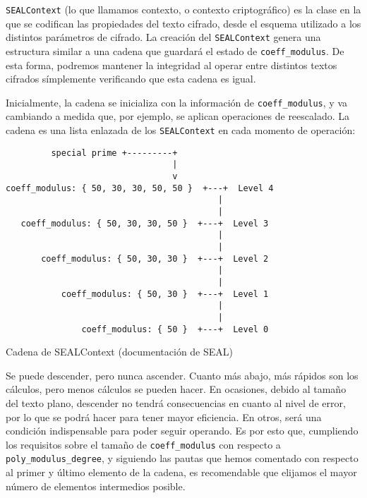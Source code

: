 \verb|SEALContext| (lo que llamamos contexto, o contexto criptográfico) es la clase en la que se codifican las propiedades del texto cifrado, desde el esquema utilizado a los distintos parámetros de cifrado. La creación del \verb|SEALContext| genera una estructura similar a una cadena que guardará el estado de \verb|coeff_modulus|. De esta forma, podremos mantener la integridad al operar entre distintos textos cifrados símplemente verificando que esta cadena es igual.

Inicialmente, la cadena se inicializa con la información de \verb|coeff_modulus|, y va cambiando a medida que, por ejemplo, se aplican operaciones de reescalado. La cadena es una lista enlazada de los \verb|SEALContext| en cada momento de operación:

\begin{listing}[ht]
    \begin{verbatim}
         special prime +---------+
                                 |
                                 v
coeff_modulus: { 50, 30, 30, 50, 50 }  +---+  Level 4
                                          |
                                          |
   coeff_modulus: { 50, 30, 30, 50 }  +---+  Level 3
                                          |
                                          |
       coeff_modulus: { 50, 30, 30 }  +---+  Level 2
                                          |
                                          |
           coeff_modulus: { 50, 30 }  +---+  Level 1
                                          |
                                          |
               coeff_modulus: { 50 }  +---+  Level 0
    \end{verbatim}
    \caption{Cadena de SEALContext (documentación de SEAL)}
    \label{fig:seal_levels}
\end{listing}

Se puede descender, pero nunca ascender. Cuanto más abajo, más rápidos son los cálculos, pero menos cálculos se pueden hacer. En ocasiones, debido al tamaño del texto plano, descender no tendrá consecuencias en cuanto al nivel de error, por lo que se podrá hacer para tener mayor eficiencia. En otros, será una condición indispensable para poder seguir operando. Es por esto que, cumpliendo los requisitos sobre el tamaño de \verb|coeff_modulus| con respecto a \verb|poly_modulus_degree|, y siguiendo las pautas que hemos comentado con respecto al primer y último elemento de la cadena, es recomendable que elijamos el mayor número de elementos intermedios posible.

